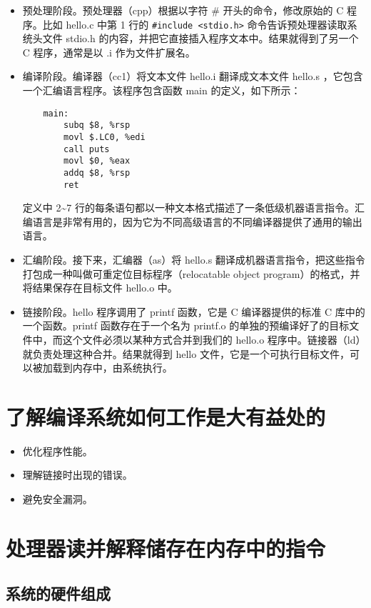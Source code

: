 \begin{itemize}
    \item 预处理阶段。预处理器（cpp）根据以字符 \# 开头的命令，修改原始的 C 程序。比如 hello.c 中第 1 行的 \texttt{#include <stdio.h>} 命令告诉预处理器读取系统头文件 stdio.h 的内容，并把它直接插入程序文本中。结果就得到了另一个 C 程序，通常是以 .i 作为文件扩展名。
    \item 编译阶段。编译器（cc1）将文本文件 hello.i 翻译成文本文件 hello.s ，它包含一个汇编语言程序。该程序包含函数 main 的定义，如下所示：
    \begin{verbatim}
    main:
        subq $8, %rsp
        movl $.LC0, %edi
        call puts
        movl $0, %eax
        addq $8, %rsp
        ret
    \end{verbatim}
    定义中 2\~{}7 行的每条语句都以一种文本格式描述了一条低级机器语言指令。汇编语言是非常有用的，因为它为不同高级语言的不同编译器提供了通用的输出语言。
    \item 汇编阶段。接下来，汇编器（as）将 hello.s 翻译成机器语言指令，把这些指令打包成一种叫做可重定位目标程序（relocatable object program）的格式，并将结果保存在目标文件 hello.o 中。
    \item 链接阶段。hello 程序调用了 printf 函数，它是 C 编译器提供的标准 C 库中的一个函数。printf 函数存在于一个名为 printf.o 的单独的预编译好了的目标文件中，而这个文件必须以某种方式合并到我们的 hello.o 程序中。链接器（ld）就负责处理这种合并。结果就得到 hello 文件，它是一个可执行目标文件，可以被加载到内存中，由系统执行。
\end{itemize}

\section{了解编译系统如何工作是大有益处的}

\begin{itemize}
    \item 优化程序性能。
    \item 理解链接时出现的错误。
    \item 避免安全漏洞。
\end{itemize}

\section{处理器读并解释储存在内存中的指令}

\subsection{系统的硬件组成}

